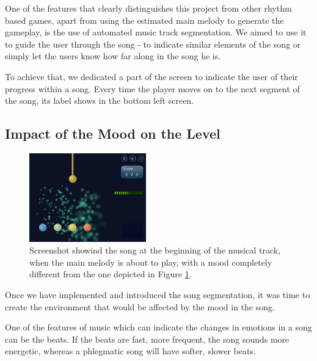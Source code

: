 One of the features that clearly distinguishes this project from other rhythm based games, apart from using the estimated main melody to generate the gameplay, is the use of automated music track segmentation. We aimed to use it to guide the user through the song - to indicate similar elements of the song or simply let the users know how far along in the song he is. 

To achieve that, we dedicated a part of the screen to indicate the user of their progress within a song. Every time the player moves on to the next segment of the song, its label shows in the bottom left screen.

\vspace{10pt}

\subsection{Impact of the Mood on the Level}

\begin{figure}
  \vspace{-10pt}
  \begin{center}
    \includegraphics[width=0.45\textwidth]{Figures/sparkChange}
  \end{center}
  \caption{Screenshot showind the song at the beginning of the musical track, when the main melody is about to play, with a mood completely different from the one depicted in Figure \ref{fig:notetypes}.}
\label{fig:notetypes}
\end{figure}



Once we have implemented and introduced the song segmentation, it was time to create the environment that would be affected by the mood in the song.

One of the features of music which can indicate the changes in emotions in a song can be the beats. If the beats are fast, more frequent, the song sounds more energetic, whereas a phlegmatic song will have softer, slower beats. 

